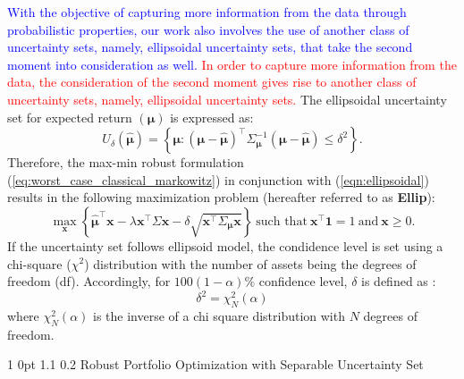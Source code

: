 \documentclass[12pt]{article}
\makeatletter
\numberwithin{equation}{section}
\renewcommand{\subsection}{
  \@startsection
  {subsection}%
  {1}%
  {0pt}%
  {1.1\baselineskip}%
  {0.2\baselineskip}%
  {\sc \centering}%
}
\makeatother
\begin{document}
\textcolor{blue}{With the objective of capturing more information from the data through probabilistic properties, our work also involves the use of another class of uncertainty sets, namely, ellipsoidal uncertainty sets, that take the second moment into consideration as well.} \textcolor{red}{In order to capture more information from the data, the consideration of the second moment gives rise to another class of uncertainty sets, namely, ellipsoidal uncertainty sets.} The ellipsoidal uncertainty set for expected return $\left(\boldsymbol{\mu}\right)$ is expressed as:
\begin{equation}
\label{eqn:ellipsoidal}
U_{\delta}(\boldsymbol{\hat{\mu}})=\left\{\boldsymbol{\mu}: (\boldsymbol{\mu}-\boldsymbol{\hat{\mu}})^{\top}\Sigma^{-1}_{\boldsymbol{\mu}}
(\boldsymbol{\mu}-\boldsymbol{\hat{\mu}})\leq\delta^2 \right\}.
\end{equation}
Therefore, the max-min robust formulation (\ref{eq:worst_case_classical_markowitz}) in conjunction with (\ref{eqn:ellipsoidal}) results in the following maximization problem (hereafter referred to as \textbf{Ellip}):
\begin{equation}
\label{eqn:ellipsoidal_markowitz}
\max\limits_{\mathbf{x}}\left\{\boldsymbol{\hat{\mu}}^{\top}\mathbf{x}-\lambda \mathbf{x}^{\top}\Sigma\mathbf{x}
-\delta\sqrt{\mathbf{x}^{\top}\Sigma_{\boldsymbol{\mu}}\mathbf{x}}\right\}~\text{such that}~\mathbf{x^{\top}}\mathbf{1}=1~\text{and}~\mathbf{x}\geq 0.
\end{equation}
If the uncertainty set follows ellipsoid model, the condidence level is set using a chi-square ($\chi^{2}$) distribution with the number of assets being the degrees of freedom (df).
Accordingly, for $100(1-\alpha)\%$ confidence level, $\delta$ is defined as \cite{Ceria06,Scherer07}:
\begin{equation}
\delta^2=\chi_{N}^2(\alpha)
\end{equation}
where $\chi_{N}^2(\alpha)$ is the inverse of a chi square distribution with $N$ degrees of freedom.

\subsection{Robust Portfolio Optimization with Separable Uncertainty Set}
\end{document}
